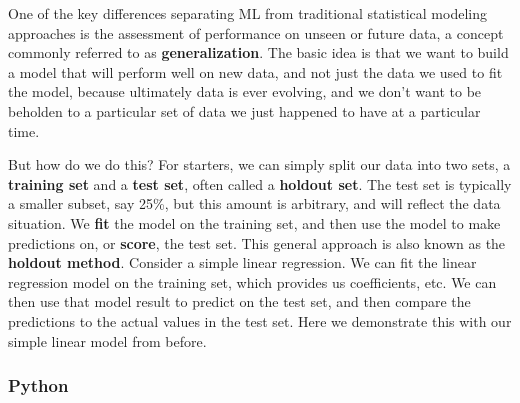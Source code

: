 \documentclass[
  letterpaper,
]{krantz}
\begin{document}
One of the key differences separating ML from traditional statistical
modeling approaches is the assessment of performance on unseen or future
data, a concept commonly referred to as \textbf{generalization}. The
basic idea is that we want to build a model that will perform well on
new data, and not just the data we used to fit the model, because
ultimately data is ever evolving, and we don't want to be beholden to a
particular set of data we just happened to have at a particular time.

But how do we do this? For starters, we can simply split our data into
two sets, a \textbf{training set} and a \textbf{test set}, often called
a \textbf{holdout set}. The test set is typically a smaller subset, say
25\%, but this amount is arbitrary, and will reflect the data situation.
We \textbf{fit} the model on the training set, and then use the model to
make predictions on, or \textbf{score}, the test set. This general
approach is also known as the \textbf{holdout method}. Consider a simple
linear regression. We can fit the linear regression model on the
training set, which provides us coefficients, etc. We can then use that
model result to predict on the test set, and then compare the
predictions to the actual values in the test set. Here we demonstrate
this with our simple linear model from before.

\subsubsection{Python}
\end{document}
